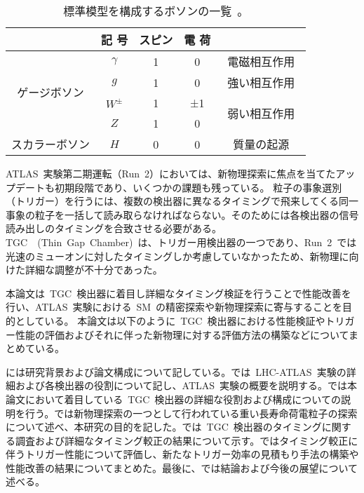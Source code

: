\begin{table}[htbp]
	\centering
	\begin{tabular}{c|c|c|c|c}\hline
	&記 号& スピン & 電 荷 &\\ \hline\hline
	\multirow{4}{*}{ゲージボソン} & $\gamma$ & 1 & 0 & 電磁相互作用　\\
	 & $g$ & 1 & 0 & 強い相互作用　\\
	 & $W^{±}$ & 1 & ±1 & \multirow{2}{*}{弱い相互作用}　\\
	 & $Z$ & 1 & 0 &  \\ \hline
	スカラーボソン & $H$ & 0 & 0 & 質量の起源
	\end{tabular}
	\caption[標準模型を構成するボソンの一覧]{標準模型を構成するボソンの一覧~\cite{URL:10}。}
	\label{tb:SM2}
\end{table}

ATLAS~実験第二期運転（Run~2）においては、新物理探索に焦点を当てたアップデートも初期段階であり、いくつかの課題も残っている。
粒子の事象選別（トリガー）を行うには、複数の検出器に異なるタイミングで飛来してくる同一事象の粒子を一括して読み取らなければならない。そのためには各検出器の信号読み出しのタイミングを合致させる必要がある。TGC~\cite{TR:04}~(Thin~Gap~Chamber)~は、トリガー用検出器の一つであり、Run~2~では光速のミューオンに対したタイミングしか考慮していなかったため、新物理に向けた詳細な調整が不十分であった。

本論文は~TGC~検出器に着目し詳細なタイミング検証を行うことで性能改善を行い、ATLAS~実験における~SM~の精密探索や新物理探索に寄与することを目的としている。
本論文は以下のように~TGC~検出器における性能検証やトリガー性能の評価およびそれに伴った新物理に対する評価方法の構築などについてまとめている。

には研究背景および論文構成について記している。では~LHC-ATLAS~実験の詳細および各検出器の役割について記し、ATLAS~実験の概要を説明する。では本論文において着目している~TGC~検出器の詳細な役割および構成についての説明を行う。では新物理探索の一つとして行われている重い長寿命荷電粒子の探索について述べ、本研究の目的を記した。では~TGC~検出器のタイミングに関する調査および詳細なタイミング較正の結果について示す。ではタイミング較正に伴うトリガー性能について評価し、新たなトリガー効率の見積もり手法の構築や性能改善の結果についてまとめた。最後に、では結論および今後の展望について述べる。